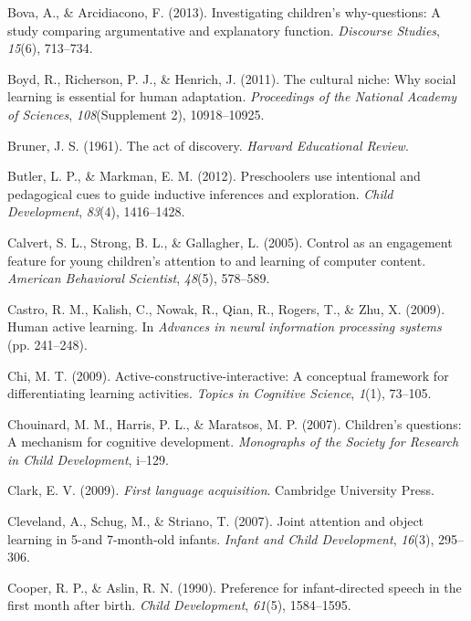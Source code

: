 \documentclass[a4paper,man,apacite,floatsintext]{apa6}
\begin{document}
\hypertarget{ref-bova2013investigating}{}
Bova, A., \& Arcidiacono, F. (2013). Investigating children's
why-questions: A study comparing argumentative and explanatory function.
\emph{Discourse Studies}, \emph{15}(6), 713--734.

\hypertarget{ref-boyd2011cultural}{}
Boyd, R., Richerson, P. J., \& Henrich, J. (2011). The cultural niche:
Why social learning is essential for human adaptation. \emph{Proceedings
of the National Academy of Sciences}, \emph{108}(Supplement 2),
10918--10925.

\hypertarget{ref-bruner1961act}{}
Bruner, J. S. (1961). The act of discovery. \emph{Harvard Educational
Review}.

\hypertarget{ref-butler2012preschoolers}{}
Butler, L. P., \& Markman, E. M. (2012). Preschoolers use intentional
and pedagogical cues to guide inductive inferences and exploration.
\emph{Child Development}, \emph{83}(4), 1416--1428.

\hypertarget{ref-calvert2005control}{}
Calvert, S. L., Strong, B. L., \& Gallagher, L. (2005). Control as an
engagement feature for young children's attention to and learning of
computer content. \emph{American Behavioral Scientist}, \emph{48}(5),
578--589.

\hypertarget{ref-castro2009human}{}
Castro, R. M., Kalish, C., Nowak, R., Qian, R., Rogers, T., \& Zhu, X.
(2009). Human active learning. In \emph{Advances in neural information
processing systems} (pp. 241--248).

\hypertarget{ref-chi2009active}{}
Chi, M. T. (2009). Active-constructive-interactive: A conceptual
framework for differentiating learning activities. \emph{Topics in
Cognitive Science}, \emph{1}(1), 73--105.

\hypertarget{ref-chouinard2007children}{}
Chouinard, M. M., Harris, P. L., \& Maratsos, M. P. (2007). Children's
questions: A mechanism for cognitive development. \emph{Monographs of
the Society for Research in Child Development}, i--129.

\hypertarget{ref-clark2009first}{}
Clark, E. V. (2009). \emph{First language acquisition}. Cambridge
University Press.

\hypertarget{ref-cleveland2007joint}{}
Cleveland, A., Schug, M., \& Striano, T. (2007). Joint attention and
object learning in 5-and 7-month-old infants. \emph{Infant and Child
Development}, \emph{16}(3), 295--306.

\hypertarget{ref-cooper1990preference}{}
Cooper, R. P., \& Aslin, R. N. (1990). Preference for infant-directed
speech in the first month after birth. \emph{Child Development},
\emph{61}(5), 1584--1595.
\end{document}
